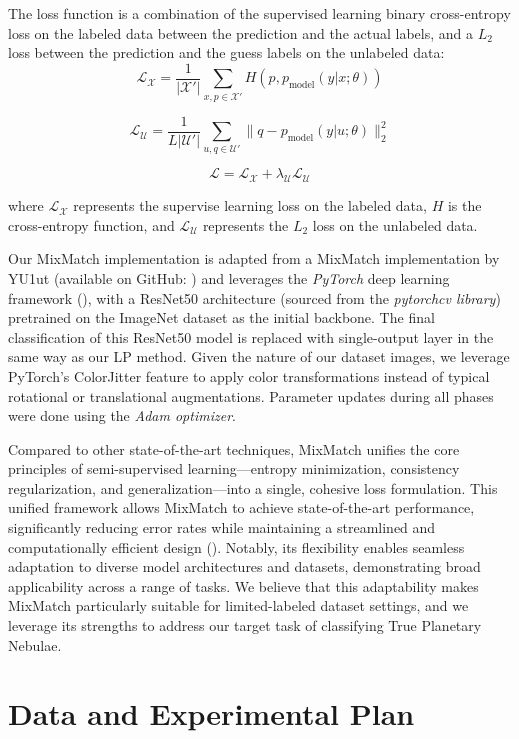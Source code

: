 \documentclass{article}
\begin{document}
The loss function is a combination of the supervised learning binary cross-entropy loss on the labeled data between the prediction and the actual labels, and a $L_2$ loss between the prediction and the guess labels on the unlabeled data:
\[
    \mathcal{L}_{\mathcal{X}} = \frac{1}{|\mathcal{X}'|} \sum_{x,p \in \mathcal{X}'} H(p, p_{\text{model}}(y|x;\theta))
\]

\[
    \mathcal{L}_{\mathcal{U}} = \frac{1}{L|\mathcal{U}'|} \sum_{u,q \in \mathcal{U}'} \|q - p_{\text{model}}(y|u;\theta)\|_2^2
\]

\[
    \mathcal{L} = \mathcal{L}_{\mathcal{X}} + \lambda_{\mathcal{U}}\mathcal{L}_{\mathcal{U}}
\]

where $\mathcal{L}_{\mathcal{X}}$ represents the supervise learning loss on the labeled data, $H$ is the cross-entropy function, and $\mathcal{L}_{\mathcal{U}}$ represents the $L_2$ loss on the unlabeled data.

Our MixMatch implementation is adapted from a MixMatch implementation by YU1ut (available on GitHub: \cite{yu1ut_mixmatch_pytorch}) and leverages the \textit{PyTorch} deep learning framework (\cite{paszke2019pytorch}), with a ResNet50 architecture (sourced from the \textit{pytorchcv library}) pretrained on the ImageNet dataset as the initial backbone. The final classification of this ResNet50 model is replaced with single-output layer in the same way as our LP method. Given the nature of our dataset images, we leverage PyTorch's ColorJitter feature to apply color transformations instead of typical rotational or translational augmentations. Parameter updates during all phases were done using the \textit{Adam optimizer}.

Compared to other state-of-the-art techniques, MixMatch unifies the core principles of semi-supervised learning---entropy minimization, consistency regularization, and generalization---into a single, cohesive loss formulation. This unified framework allows MixMatch to achieve state-of-the-art performance, significantly reducing error rates while maintaining a streamlined and computationally efficient design (\cite{berthelot2019mixmatch}). Notably, its flexibility enables seamless adaptation to diverse model architectures and datasets, demonstrating broad applicability across a range of tasks. We believe that this adaptability makes MixMatch particularly suitable for limited-labeled dataset settings, and we leverage its strengths to address our target task of classifying True Planetary Nebulae.

\section{Data and Experimental Plan}
\end{document}
